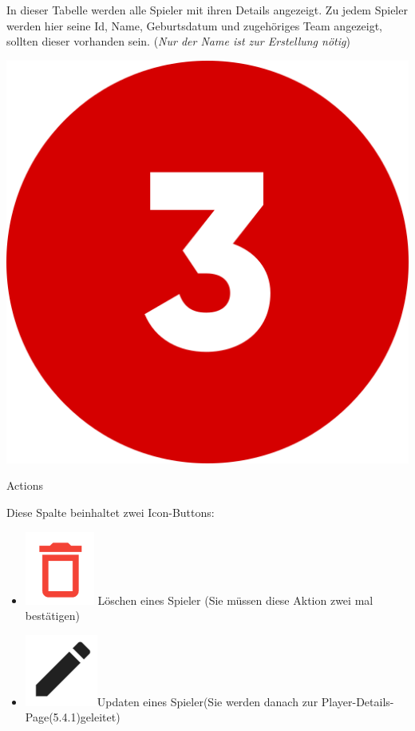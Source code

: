 In dieser Tabelle werden alle Spieler mit ihren Details angezeigt. Zu jedem Spieler werden hier seine Id, Name, Geburtsdatum und zugehöriges Team angezeigt,
sollten dieser vorhanden sein. (\textit{Nur der Name ist zur Erstellung nötig})

\bigskip
\includegraphics[scale=0.05]{pics/user-guide/numbers/number-3.png} \begin{LARGE} Actions \end{LARGE}

Diese Spalte beinhaltet zwei Icon-Buttons:
\begin{itemize}
    \item \includegraphics[scale=0.3]{pics/user-guide/delete-icon.PNG} Löschen eines Spieler (Sie müssen diese Aktion zwei mal bestätigen)
    \item\includegraphics[scale=0.3]{pics/user-guide/edit-icon.PNG}Updaten eines Spieler(Sie werden danach zur Player-Details-Page(5.4.1)geleitet)
\end{itemize}

